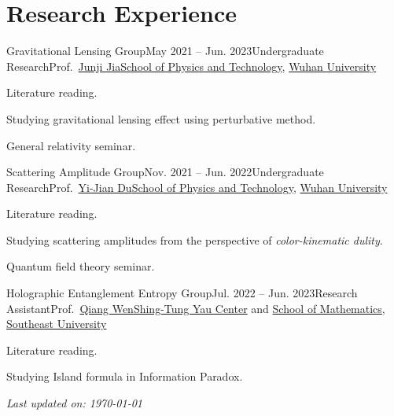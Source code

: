 \documentclass{resume}
\begin{document}
\section{Research Experience}
\begin{content}

    \begin{position}{Gravitational Lensing Group}{May 2021 -- Jun. 2023}{Undergraduate Research}{Prof.~\href{https://inspirehep.net/authors/1041286}{Junji Jia}}{\href{https://physics.whu.edu.cn}{School of Physics and Technology}, \href{https://www.whu.edu.cn}{Wuhan University}}
        \item Literature reading.
        \item Studying gravitational lensing effect using perturbative method.
        \item General relativity seminar.
    \end{position}
    \vspace{-.5\baselineskip}

    \begin{position}{Scattering Amplitude Group}{Nov. 2021 -- Jun. 2022}{Undergraduate Research}{Prof.~\href{https://inspirehep.net/authors/1065266}{Yi-Jian Du}}{\href{https://physics.whu.edu.cn}{School of Physics and Technology}, \href{https://www.whu.edu.cn}{Wuhan University}}
        \item Literature reading.
        \item Studying scattering amplitudes from the perspective of \textit{color-kinematic dulity}.
        \item Quantum field theory seminar.
    \end{position}
    \vspace{-.5\baselineskip}

    \begin{position}{Holographic Entanglement Entropy Group}{Jul. 2022 -- Jun. 2023}{Research Assistant}{Prof.~\href{https://inspirehep.net/authors/1275750}{Qiang Wen}}{\href{https://yauc.seu.edu.cn/}{Shing-Tung Yau Center} and \href{https://math.seu.edu.cn/}{School of Mathematics}, \href{https://www.seu.edu.cn/}{Southeast University}}
        \item Literature reading.
        \item Studying Island formula in Information Paradox.
    \end{position}
    \vspace{-.5\baselineskip}
    \sectionlineskip
\end{content}


\noindent
\renewcommand{\refname}{Publications}   %

\nocite{*}
\sectionlineskip



\begin{center}
    \vfill
    \textit{Last updated on: \today}
\end{center}
\end{document}
